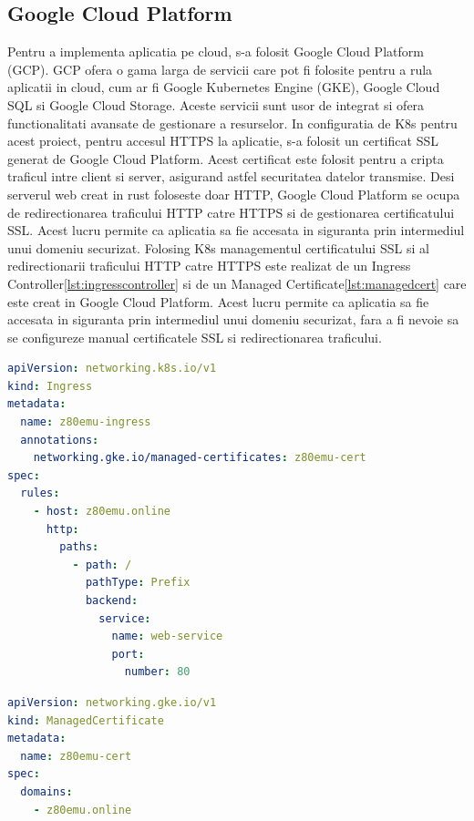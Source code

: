 \documentclass[titlepage,12pt]{article}
\DeclareRobustCommand{\code}[1]{{\ttfamily\small #1}}
\begin{document}
\subsection{Google Cloud Platform}
Pentru a implementa aplicatia pe cloud, s-a folosit Google Cloud Platform (GCP). GCP ofera o gama larga de servicii care pot fi folosite pentru a rula aplicatii in cloud, cum ar fi Google Kubernetes Engine (GKE), Google Cloud SQL si Google Cloud Storage. Aceste servicii sunt usor de integrat si ofera functionalitati avansate de gestionare a resurselor.
In configuratia de \ac {K8s} pentru acest proiect, pentru accesul \code{HTTPS} la aplicatie, s-a folosit un certificat \code{SSL} generat de Google Cloud Platform. Acest certificat este folosit pentru a cripta traficul intre client si server, asigurand astfel securitatea datelor transmise. Desi serverul web creat in rust foloseste doar \code{HTTP}, Google Cloud Platform se ocupa de redirectionarea traficului \code{HTTP} catre \code{HTTPS} si de gestionarea certificatului \code{SSL}. Acest lucru permite ca aplicatia sa fie accesata in siguranta prin intermediul unui domeniu securizat.
Folosing \ac {K8s} managementul certificatului \code{SSL} si al redirectionarii traficului \code{HTTP} catre \code{HTTPS} este realizat de un \code{Ingress Controller}\cref{lst:ingresscontroller} si de un \code{Managed Certificate}\cref{lst:managedcert} care este creat in Google Cloud Platform. Acest lucru permite ca aplicatia sa fie accesata in siguranta prin intermediul unui domeniu securizat, fara a fi nevoie sa se configureze manual certificatele \code{SSL} si redirectionarea traficului.

\begin{lstlisting}[language=yaml,caption={Ingress Controller pentru aplicatie},label={lst:ingresscontroller}]
apiVersion: networking.k8s.io/v1
kind: Ingress
metadata:
  name: z80emu-ingress
  annotations:
    networking.gke.io/managed-certificates: z80emu-cert
spec:
  rules:
    - host: z80emu.online
      http:
        paths:
          - path: /
            pathType: Prefix
            backend:
              service:
                name: web-service
                port:
                  number: 80
\end{lstlisting}

\begin{lstlisting}[language=yaml,caption={Managed Certificate pentru aplicatie},label={lst:managedcert}]
apiVersion: networking.gke.io/v1
kind: ManagedCertificate
metadata:
  name: z80emu-cert
spec:
  domains:
    - z80emu.online
\end{lstlisting}
\end{document}
